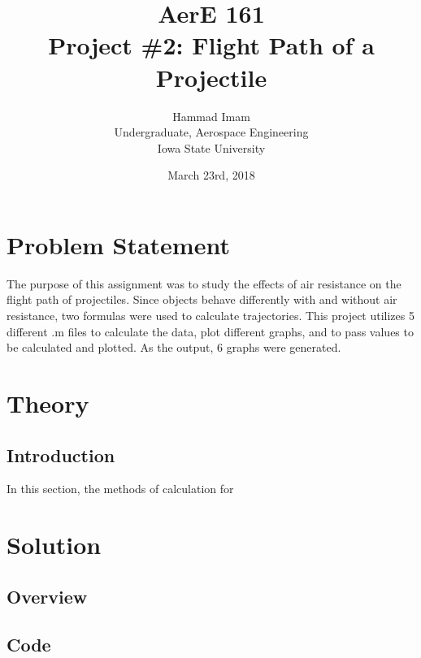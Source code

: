 \documentclass{article}
\title{AerE 161 \\ Project \#2: Flight Path of a Projectile}
\author{Hammad Imam \\ Undergraduate, Aerospace Engineering \\ Iowa State University}
\date{March 23rd,	2018}
\begin{document}
\begin{titlepage}
\maketitle
\end{titlepage}

\clearpage
\tableofcontents

\newpage

\section{Problem Statement}
The purpose of this assignment was to study the effects of air resistance on the flight path of projectiles. Since objects behave differently with and without air resistance, two formulas were used to calculate trajectories. This project utilizes 5 different .m files to calculate the data, plot different graphs, and to pass values to be calculated and plotted. As the output, 6 graphs were generated.

\newpage
\section{Theory}
\subsection{Introduction}
In this section, the methods of calculation for 

\newpage
\section{Solution}
\subsection{Overview}
\subsection{Code}
\end{document}
